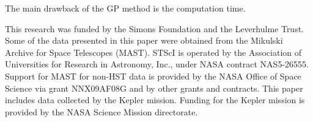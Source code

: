 \documentclass[useAMS, usenatbib, preprint, 12pt]{aastex}
\begin{document}
The main drawback of the GP method is the computation time.

This research was funded by the Simons Foundation and the Leverhulme Trust.
Some of the data presented in this paper were obtained from the Mikulski
Archive for Space Telescopes (MAST).
STScI is operated by the Association of Universities for Research in
Astronomy, Inc., under NASA contract NAS5-26555.
Support for MAST for non-HST data is provided by the NASA Office of Space
Science via grant NNX09AF08G and by other grants and contracts.
This paper includes data collected by the Kepler mission. Funding for the
Kepler mission is provided by the NASA Science Mission directorate.



\end{document}
